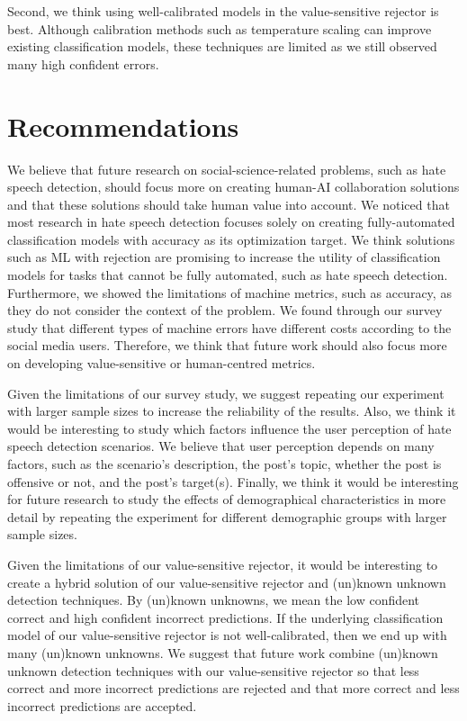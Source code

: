 %
Second, we think using well-calibrated models in the value-sensitive rejector is best.
%
Although calibration methods such as temperature scaling can improve existing classification models, these techniques are limited as we still observed many high confident errors.
%


\section{Recommendations}
\label{sec:discussion-recommendations}
We believe that future research on social-science-related problems, such as hate speech detection, should focus more on creating human-AI collaboration solutions and that these solutions should take human value into account.
%
We noticed that most research in hate speech detection focuses solely on creating fully-automated classification models with accuracy as its optimization target.
%
We think solutions such as ML with rejection are promising to increase the utility of classification models for tasks that cannot be fully automated, such as hate speech detection.
%
Furthermore, we showed the limitations of machine metrics, such as accuracy, as they do not consider the context of the problem.
%
We found through our survey study that different types of machine errors have different costs according to the social media users.
%
Therefore, we think that future work should also focus more on developing value-sensitive or human-centred metrics.
%

%
Given the limitations of our survey study, we suggest repeating our experiment with larger sample sizes to increase the reliability of the results.
%
Also, we think it would be interesting to study which factors influence the user perception of hate speech detection scenarios.
%
We believe that user perception depends on many factors, such as the scenario's description, the post's topic, whether the post is offensive or not, and the post's target(s).
%
Finally, we think it would be interesting for future research to study the effects of demographical characteristics in more detail by repeating the experiment for different demographic groups with larger sample sizes.
%

%
Given the limitations of our value-sensitive rejector, it would be interesting to create a hybrid solution of our value-sensitive rejector and (un)known unknown detection techniques.
%
By (un)known unknowns, we mean the low confident correct and high confident incorrect predictions.
%
If the underlying classification model of our value-sensitive rejector is not well-calibrated, then we end up with many (un)known unknowns.
%
We suggest that future work combine (un)known unknown detection techniques with our value-sensitive rejector so that less correct and more incorrect predictions are rejected and that more correct and less incorrect predictions are accepted.
%
